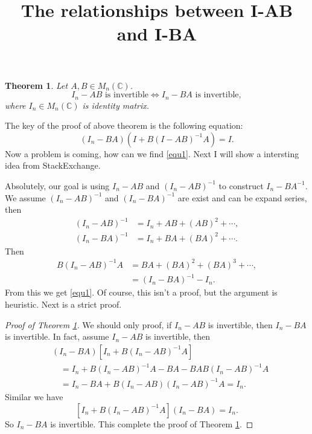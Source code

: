 \documentclass[a4paper,12pt]{article}
\title{The relationships between I-AB and I-BA}
\newtheorem{theorem}{Theorem}[section]
\theoremstyle{definition}
\begin{document}
\begin{CJK*}{UTF8}{gbsn}

\maketitle

\begin{theorem} \label{thm1}
    Let $ A, B \in M_n(\mathbb{C}) $.
    $$
        I_n-AB \text{ is invertible} \Longleftrightarrow I_n-BA \text{ is invertible},
    $$
    where $ I_n \in M_n(\mathbb{C}) $ is identity matrix.
\end{theorem}

The key of the proof of above theorem is the following equation:
\begin{equation} \label{equ1}
    (I_n - BA)(I + B (I - AB)^{-1} A) = I.
\end{equation}
Now a problem is coming, how can we find \eqref{equ1}. Next I will show a intersting idea from StackExchange.

Absolutely, our goal is using $ I_n-AB $ and $ (I_n-AB)^{-1} $ to construct $ {I_n - BA}^{-1} $.
We assume $ (I_n - AB)^{-1} $ and $ (I_n - BA)^{-1} $ are exist and can be expand series, then
\begin{align*}
    (I_n - AB)^{-1} &= I_n + AB + (AB)^2 + \cdots, \\
    (I_n - BA)^{-1} &= I_n + BA + (BA)^2 + \cdots.
\end{align*}
Then
\begin{align*}
    B(I_n - AB)^{-1}A &= BA + (BA)^2 + (BA)^3 + \cdots, \\
                      &= (I_n - BA)^{-1} - I_n.
\end{align*}
From this we get \eqref{equ1}. Of course, this isn't a proof, but the argument is heuristic. Next is a strict proof.

\begin{proof}[Proof of Theorem \ref{thm1}]
    We should only proof, if $ I_n-AB $ is invertible, then $ I_n-BA $ is invertible.
    In fact, assume $ I_n-AB $ is invertible, then
    \begin{align*}
        &(I_n - BA)[I_n + B (I_n - AB)^{-1} A] \\
            &\quad= I_n + B (I_n - AB)^{-1} A - BA - BAB (I_n - AB)^{-1} A \\
            &\quad= I_n - BA + B (I_n - AB) (I_n - AB)^{-1} A = I_n.
    \end{align*}
    Similar we have
    $$
        [I_n + B (I_n - AB)^{-1} A](I_n - BA) = I_n.
    $$
    So $ I_n-BA $ is invertible. This complete the proof of Theorem \ref{thm1}.
\end{proof}

\end{CJK*}
\end{document}
